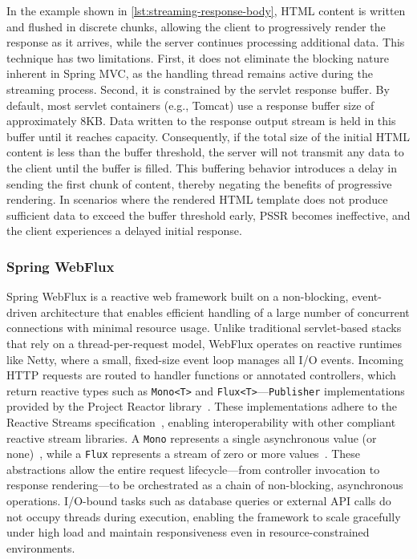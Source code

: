 In the example shown in \autoref{lst:streaming-response-body}, HTML content is
written and flushed in discrete chunks, allowing the client to progressively
render the response as it arrives, while the server continues processing
additional data. This technique has two limitations. First, it does
not eliminate the blocking nature inherent in Spring MVC, as the handling
thread remains active during the streaming process. Second, it is constrained
by the servlet response buffer. By default, most servlet containers (e.g.,
Tomcat) use a response buffer size of approximately 8KB. Data written to the
response output stream is held in this buffer until it reaches capacity.
Consequently, if the total size of the initial HTML content is less than the
buffer threshold, the server will not transmit any data to the client until the
buffer is filled. This buffering behavior introduces a delay in sending the
first chunk of content, thereby negating the benefits of progressive rendering.
In scenarios where the rendered HTML template does not produce sufficient data
to exceed the buffer threshold early, PSSR becomes ineffective, and the client
experiences a delayed initial response.

\subsubsection{Spring WebFlux}

Spring WebFlux is a reactive web framework built on a non-blocking,
event-driven architecture that enables efficient handling of a large number of
concurrent connections with minimal resource usage. Unlike traditional
servlet-based stacks that rely on a thread-per-request model, WebFlux operates
on reactive runtimes like Netty, where a small, fixed-size event loop manages
all I/O events. Incoming HTTP requests are routed to handler functions or
annotated controllers, which return reactive types such as \texttt{Mono<T>} and
\texttt{Flux<T>}—\texttt{Publisher} implementations provided by the Project
Reactor library~\cite{projectreactor}. These implementations adhere to the
Reactive Streams specification~\cite{ReactiveStreams}, enabling
interoperability with other compliant reactive stream libraries. A
\texttt{Mono} represents a single asynchronous value (or none)~\cite{promise},
while a \texttt{Flux} represents a stream of zero or more
values~\cite{rx-observable}. These abstractions allow the entire request
lifecycle—from controller invocation to response rendering—to be orchestrated
as a chain of non-blocking, asynchronous operations. I/O-bound tasks such as
database queries or external API calls do not occupy threads during execution,
enabling the framework to scale gracefully under high load and maintain
responsiveness even in resource-constrained environments.

